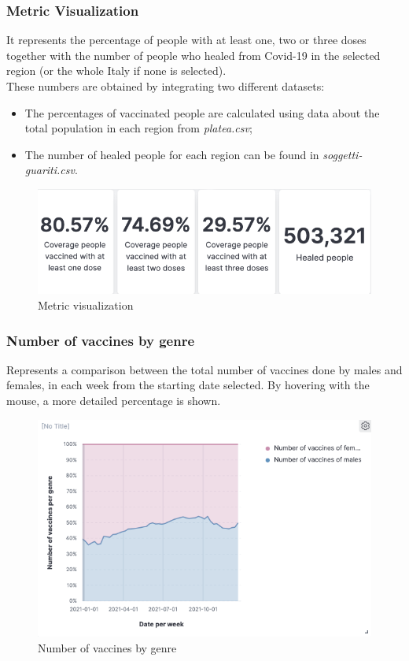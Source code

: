 \documentclass[12pt, a4paper]{article}
\begin{document}
\subsubsection{Metric Visualization}
It represents the percentage of people with at least one, two or three doses together 
with the number of people who healed from Covid-19 in the selected region (or the whole 
Italy if none is selected). \\
These numbers are obtained by integrating two different datasets:
\begin{itemize}
  \item The percentages of vaccinated people are calculated using data about the total
    population in each region from \emph{platea.csv};
  \item The number of healed people for each region can be found in 
    \emph{soggetti-guariti.csv}.
\end{itemize}
\begin{figure}[H]
  \centering
  \includegraphics[width=.8\linewidth]{img (8).png}
  \caption*{Metric visualization}
\end{figure}

\subsubsection{Number of vaccines by genre}
Represents a comparison between the total number of vaccines done by males and females,
in each week from the starting date selected. By hovering with the mouse, a more 
detailed percentage is shown.
\begin{figure}[H]
  \centering
  \includegraphics[width=.8\linewidth]{img (9).png}
  \caption*{Number of vaccines by genre}
\end{figure}
\end{document}
